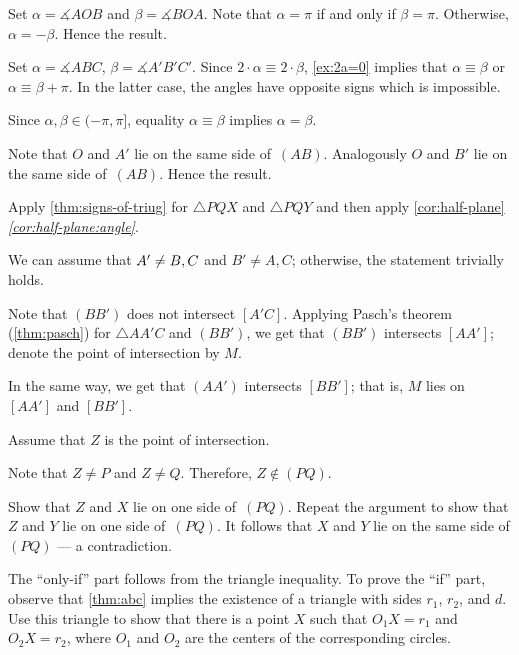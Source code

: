 \begin{multicols}{2}
Set $\alpha=\measuredangle AOB$ 
and 
$\beta=\measuredangle BOA$.
Note that $\alpha=\pi$ if and only if $\beta=\pi$.
Otherwise, $\alpha=-\beta$.
Hence the result.

Set $\alpha=\measuredangle ABC$, $\beta=\measuredangle A'B'C'$.
Since $2\cdot\alpha\equiv 2\cdot \beta$, \ref{ex:2a=0} implies that
 $\alpha\equiv \beta$ or $\alpha\equiv \beta+\pi$.
In the latter case, the angles have opposite signs which is impossible.

Since $\alpha,\beta\in(-\pi,\pi]$, equality $\alpha\equiv \beta$ implies $\alpha= \beta$.

Note that $O$ and $A'$
lie on the same side of~$(AB)$.
Analogously $O$ and $B'$
lie on the same side of~$(AB)$.
Hence the result.

Apply \ref{thm:signs-of-triug} for $\triangle PQX$ and $\triangle PQY$ and then 
apply \ref{cor:half-plane}\textit{\ref{cor:half-plane:angle}}.

We can assume that $A'\z\ne B,C$ and $B'\ne A, C$;
otherwise, the statement trivially holds.

Note that $(BB')$ does not intersect $[A'C]$.
Applying Pasch's theorem (\ref{thm:pasch}) for $\triangle AA'C$ and $(BB')$, we get that 
$(BB')$ intersects $[AA']$; denote the point of intersection by $M$.

In the same way, we get that $(AA')$ intersects $[BB']$;
that is, $M$ lies on $[AA']$ and $[BB']$.

Assume that $Z$ is the point of intersection.

Note that $Z\ne P$ and $Z\ne Q$.
Therefore, $Z\notin (PQ)$.

Show that $Z$ and $X$ lie on one side of~$(PQ)$.
Repeat the argument to show that $Z$ and $Y$ lie on one side of~$(PQ)$.
It follows that $X$ and $Y$ lie on the same side of $(PQ)$ --- a contradiction.

 The ``only-if'' part follows from the triangle inequality.
To prove the ``if'' part,  
observe that \ref{thm:abc} implies the existence of a triangle with sides $r_1$, $r_2$, and $d$.
Use this triangle to show that there is a point $X$ such that $O_1X=r_1$ and $O_2X=r_2$, where $O_1$ and $O_2$ are the centers of the corresponding circles.

\setcounter{eqtn}{0}


\end{multicols}
